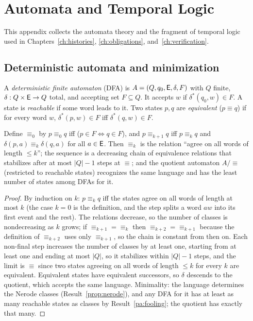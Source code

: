 \chapter{Automata and Temporal Logic}\label{app:automata}

This appendix collects the automata theory and the fragment of temporal logic used in Chapters~\ref{ch:histories}, \ref{ch:obligations}, and~\ref{ch:verification}.

\section{Deterministic automata and minimization}

A \emph{deterministic finite automaton} (DFA) is $A=(Q,q_0,\mathsf{E},\delta,F)$ with $Q$ finite, $\delta:Q\times\mathsf{E}\to Q$ total, and accepting set $F\subseteq Q$. It accepts $w$ if $\delta^*(q_0,w)\in F$. A state is \emph{reachable} if some word leads to it. Two states $p,q$ are \emph{equivalent} ($p\equiv q$) if for every word $w$, $\delta^*(p,w)\in F$ iff $\delta^*(q,w)\in F$.

\begin{newresult}\label{pc:moore}
Define $\equiv_0$ by $p\equiv_0q$ iff ($p\in F\Leftrightarrow q\in F$), and $p\equiv_{k+1}q$ iff $p\equiv_kq$ and $\delta(p,a)\equiv_k\delta(q,a)$ for all $a\in\mathsf{E}$. Then $\equiv_k$ is the relation ``agree on all words of length $\le k$''; the sequence is a decreasing chain of equivalence relations that stabilizes after at most $|Q|-1$ steps at $\equiv$; and the quotient automaton $A/{\equiv}$ (restricted to reachable states) recognizes the same language and has the least number of states among DFAs for it.
\end{newresult}
\begin{proof}
By induction on $k$: $p\equiv_kq$ iff the states agree on all words of length at most $k$ (the case $k=0$ is the definition, and the step splits a word $aw$ into its first event and the rest). The relations decrease, so the number of classes is nondecreasing as $k$ grows; if $\equiv_{k+1}=\equiv_k$ then $\equiv_{k+2}=\equiv_{k+1}$ because the definition of $\equiv_{k+2}$ uses only $\equiv_{k+1}$, so the chain is constant from then on. Each non-final step increases the number of classes by at least one, starting from at least one and ending at most $|Q|$, so it stabilizes within $|Q|-1$ steps, and the limit is $\equiv$ since two states agreeing on all words of length $\le k$ for every $k$ are equivalent. Equivalent states have equivalent successors, so $\delta$ descends to the quotient, which accepts the same language. Minimality: the language determines the Nerode classes (Result~\ref{prop:nerode}), and any DFA for it has at least as many reachable states as classes by Result~\ref{pa:fooling}; the quotient has exactly that many.
\end{proof}

